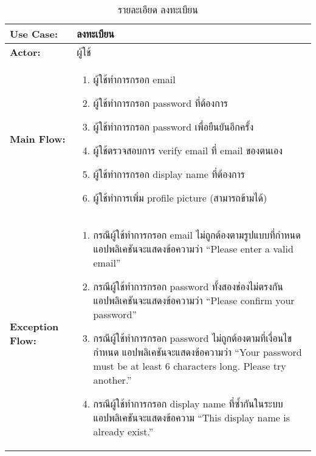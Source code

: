 \begin{table}
    \caption{รายละเอียด ลงทะเบียน}
    \begin{tabularx}{\textwidth}{ | >{\centering\bf} p{3cm} | X |}
        \hline
        Use Case: & ลงทะเบียน \\\hline
        Actor: & ผู้ใช้ \\\hline
        Main Flow: &
            \begin{enumerate}[table]
                \item ผู้ใช้ทำการกรอก email
                \item ผู้ใช้ทำการกรอก password ที่ต้องการ
                \item ผู้ใช้ทำการกรอก password เพื่อยืนยันอีกครั้ง
                \item ผู้ใช้ตรวจสอบการ verify email ที่ email ของตนเอง
                \item ผู้ใช้ทำการกรอก display name ที่ต้องการ
                \item ผู้ใช้ทำการเพิ่ม profile picture (สามารถข้ามได้)
            \end{enumerate}\\\hline
        Exception Flow: &
            \begin{enumerate}[table]
                \item กรณีผู้ใช้ทำการกรอก email ไม่ถูกต้องตามรูปแบบที่กำหนด แอปพลิเคชันจะแสดงข้อความว่า “Please enter a valid email”
                \item กรณีผู้ใช้ทำการกรอก password ทั้งสองช่องไม่ตรงกัน แอปพลิเคชันจะแสดงข้อความว่า “Please confirm your password”
                \item กรณีผู้ใช้ทำการกรอก password ไม่ถูกต้องตามที่เงื่อนไขกำหนด แอปพลิเคชันจะแสดงข้อความว่า “Your password must be at least 6 characters long. Please try another.”
                \item กรณีผู้ใช้ทำการกรอก display name ที่ซ้ำกันในระบบ แอปพลิเคชันจะแสดงข้อความ “This display name is already exist.”
            \end{enumerate}\\\hline
    \end{tabularx}
\end{table}


